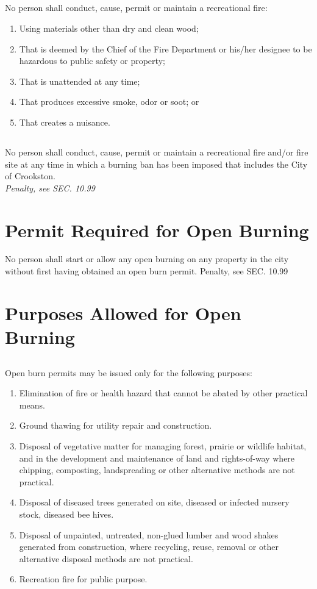 \subsection{}
No person shall conduct, cause, permit or maintain a recreational fire:
\begin{enumerate}[{\indent}1)]
    \item Using materials other than dry and clean wood;
    \item That is deemed by the Chief of the Fire Department or his/her designee to be hazardous to public safety or property;
    \item That is unattended at any time;
    \item That produces excessive smoke, odor or soot; or
    \item That creates a nuisance.
\end{enumerate}
\subsection{}
No person shall conduct, cause, permit or maintain a recreational fire and/or fire site at any time in which a burning ban has been imposed that includes the City of Crookston.\\
\emph{Penalty, see SEC. 10.99}
\section{Permit Required for Open Burning}
No person shall start or allow any open burning on any property in the city without first having obtained an open burn permit.
Penalty, see SEC. 10.99
\section{Purposes Allowed for Open Burning}
\subsection{}
Open burn permits may be issued only for the following purposes:
\begin{enumerate}[{\indent}1)]
    \item Elimination of fire or health hazard that cannot be abated by other practical means.
    \item Ground thawing for utility repair and construction.
    \item Disposal of vegetative matter for managing forest, prairie or wildlife habitat, and in the development and maintenance of land and rights-of-way where chipping, composting, landspreading or other alternative methods are not practical.
    \item Disposal of diseased trees generated on site, diseased or infected nursery stock, diseased bee hives.
    \item Disposal of unpainted, untreated, non-glued lumber and wood shakes generated from construction, where recycling, reuse, removal or other alternative disposal methods are not practical.
    \item Recreation fire for public purpose.
\end{enumerate}
